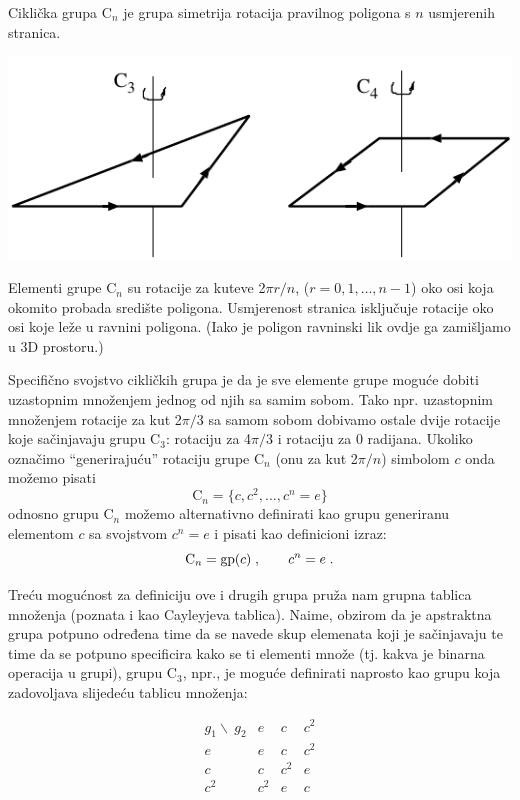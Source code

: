 \begin{primjer}
Ciklička grupa C$_n$ je grupa simetrija rotacija pravilnog poligona s $n$
usmjerenih stranica.

\centerline{\includegraphics[scale=1.0]{pics/Cn}}

Elementi grupe C$_n$ su rotacije za kuteve 2$\pi r/n$, ($r=0,1,\ldots, n-1$)
oko osi koja okomito probada središte poligona. Usmjerenost
stranica isključuje rotacije oko osi koje leže u ravnini poligona. 
(Iako je poligon ravninski lik ovdje ga zamišljamo u 3D prostoru.)

Specifično svojstvo cikličkih grupa je da je sve elemente grupe moguće
dobiti uzastopnim množenjem jednog od njih sa samim sobom.
Tako npr. uzastopnim množenjem rotacije za kut 2$\pi/3$ sa samom sobom dobivamo ostale
dvije rotacije koje sačinjavaju grupu C$_3$: rotaciju za 4$\pi/3$ i
rotaciju za 0 radijana. 
Ukoliko označimo ``generirajuću'' rotaciju grupe C$_n$ (onu za kut 2$\pi/n$) simbolom 
$c$ onda možemo pisati
\begin{equation}
 \text{C}_n = \{c,c^2, \ldots , c^n=e \}
\label{eq:cn}
\end{equation}
odnosno grupu C$_n$ možemo alternativno definirati kao grupu generiranu
elementom $c$ sa svojstvom $c^n=e$ i pisati kao definicioni izraz:
\begin{equation}
 {\rm C}_n = {\rm gp}(c) \;, \qquad c^n=e \;.
\label{eq:cngp}
\end{equation}

Treću mogućnost za definiciju ove i drugih grupa pruža nam grupna tablica množenja
(poznata i kao Cayleyjeva tablica).
Naime, obzirom da je apstraktna grupa potpuno određena time da se navede
skup elemenata koji je sačinjavaju te time da se potpuno specificira kako
se ti elementi množe (tj. kakva je binarna operacija u grupi), grupu C$_3$, npr.,
je moguće definirati naprosto kao grupu koja zadovoljava slijedeću tablicu
množenja:

\begin{equation}
\begin{array}{c|ccc}
g_1\backslash\ g_2 & e & c & c^2 \\ \hline
   e    & e & c & c^2 \\
   c    & c & c^2 & e \\
   c^2    & c^2 & e & c
\end{array}
\label{eq:cntab}
\end{equation}


\end{primjer}

